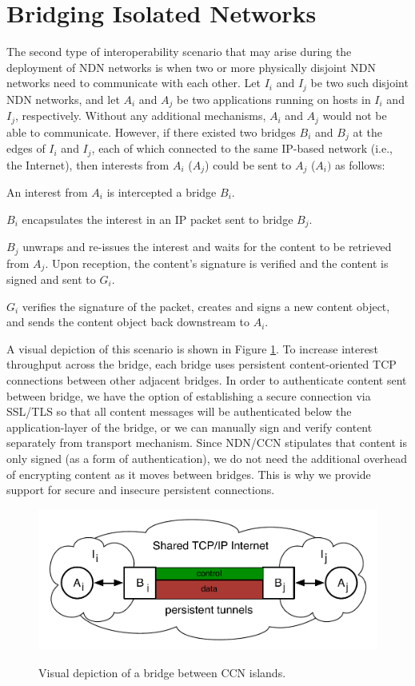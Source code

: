 \section{Bridging Isolated Networks} \label{sec:bridge}
The second type of interoperability scenario that may arise during the deployment of NDN networks is when two or more physically disjoint NDN networks need to communicate with each other. Let $I_i$ and $I_j$ be two such disjoint NDN networks, and let $A_i$ and $A_j$ be two applications running on hosts in $I_i$ and $I_j$, respectively. Without any additional mechanisms, $A_i$ and $A_j$ would not be able to communicate. However, if there existed two bridges $B_i$ and $B_j$ at the edges of $I_i$ and $I_j$, each of which connected to the same IP-based network (i.e., the Internet), then interests from $A_i$ ($A_j$) could be sent to $A_j$ ($A_i)$ as follows:
\begin{compactenum} 
	\item An interest from $A_i$ is intercepted a bridge $B_i$.
	\item $B_i$ encapsulates the interest in an IP packet sent to bridge $B_j$.
	\item $B_j$ unwraps and re-issues the interest and waits for the content to be retrieved from $A_j$. Upon reception, the content's signature is verified and the content is signed and sent to $G_i$. 
	\item $G_i$ verifies the signature of the packet, creates and signs a new content object, and sends the content object back downstream to $A_i$.
\end{compactenum}
A visual depiction of this scenario is shown in Figure \ref{fig:islands}. To increase interest throughput across the bridge, each bridge uses persistent content-oriented TCP connections between other adjacent bridges. In order to authenticate content sent between bridge, we have the option of establishing a secure connection via SSL/TLS so that all content messages will be authenticated below the application-layer of the bridge, or we can manually sign and verify content separately from transport mechanism. Since NDN/CCN stipulates that content is only signed (as a form of authentication), we do not need the additional overhead of encrypting content as it moves between bridges. This is why we provide support for secure and insecure persistent connections. 

\begin{figure}[ht!]
\begin{center}
\includegraphics[scale=0.45]{./images/island_tunnel.pdf}
\label{fig:islands}
\caption{Visual depiction of a bridge between CCN islands.}
\end{center}
\end{figure}

